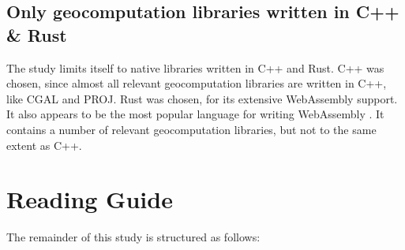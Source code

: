 
 
\subsection*{Only geocomputation libraries written in C++ \& Rust}

The study limits itself to native libraries written in C++ and Rust. 
C++ was chosen, since almost all relevant geocomputation libraries are written in C++, like CGAL and PROJ. 
Rust was chosen, for its extensive WebAssembly support. 
It also appears to be the most popular language for writing WebAssembly \citep{eberhardt_state_2022}.
It contains a number of relevant geocomputation libraries, but not to the same extent as C++.


\newpage
\section{Reading Guide}
The remainder of this study is structured as follows:


